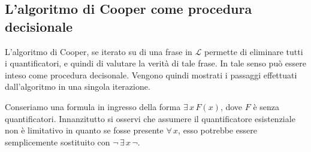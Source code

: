 \documentclass[11pt,letterpaper,twoside]{article}
\begin{document}
\subsection{L'algoritmo di Cooper come procedura decisionale}
L'algoritmo di Cooper, se iterato su di una frase in $\mathscr{L}$ permette di
eliminare tutti i quantificatori, e quindi di valutare la verità di tale
frase. In tale senso può essere inteso come procedura decisonale.
Vengono quindi mostrati i passaggi effettuati dall'algoritmo in una singola
iterazione.

Conseriamo una formula in ingresso della forma $\exists \, x \, F(x)$, dove $F$
è senza quantificatori. Innanzitutto si osservi che assumere il quantificatore
esistenziale non è limitativo in quanto se fosse presente $\forall \, x$, esso
potrebbe essere semplicemente sostituito con $\lnot \, \exists \, x \, \lnot$.
\end{document}
